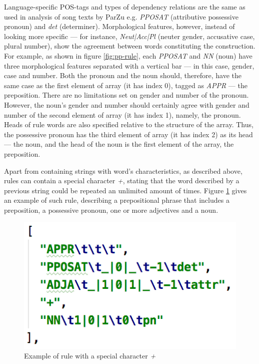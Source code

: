 Language-specific POS-tags and types of dependency relations are the same as used in analysis of song texts by ParZu e.g. \textit{PPOSAT} (attributive possessive pronoun) and \textit{det} (determiner). Morphological features, however, instead of looking more specific --- for instance, \textit{Neut|Acc|Pl} (neuter gender, accusative case, plural number), show the agreement between words constituting the construction. For example, as shown in figure \ref{fig:pp-rule}, each \textit{PPOSAT} and \textit{NN} (noun) have three morphological features separated with a vertical bar --- in this case, gender, case and number. Both the pronoun and the noun should, therefore, have the same case as the first element of array (it has index 0), tagged as \textit{APPR} --- the preposition. There are no limitations set on gender and number of the pronoun. However, the noun's gender and number should certainly agree with gender and number of the second element of array (it has index 1), namely, the pronoun. Heads of rule words are also specified relative to the structure of the array. Thus, the possessive pronoun has the third element of array (it has index 2) as its head --- the noun, and the head of the noun is the first element of the array, the preposition.

Apart from containing strings with word's characteristics, as described above, rules can contain a special character \textit{+}, stating that the word described by a previous string could be repeated an unlimited amount of times. Figure \ref{fig:pp-rule-plus} gives an example of such rule, describing a prepositional phrase that includes a preposition, a possessive pronoun, one or more adjectives and a noun.

\begin{figure}[H]
    \centering
    \includegraphics[scale = 1]{images/pp-rule-plus.png}
    \caption{Example of rule with a special character \textit{+}}
    \label{fig:pp-rule-plus}
\end{figure}

